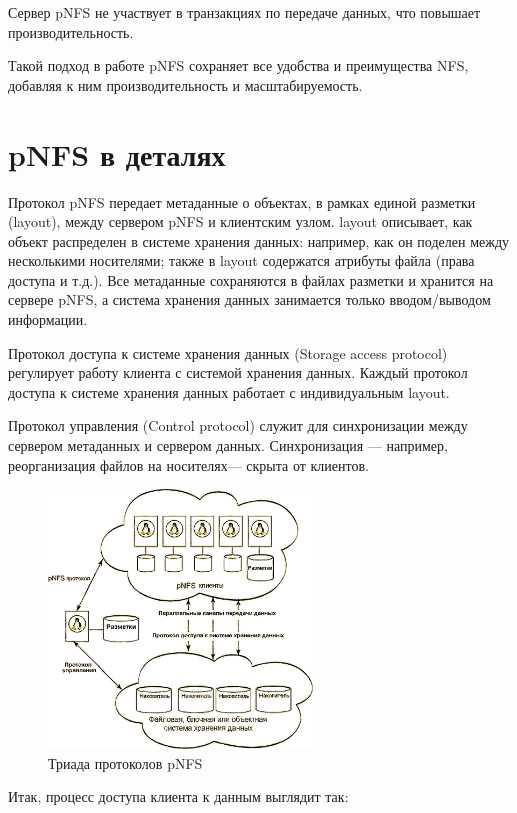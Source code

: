 \documentclass[10pt, a5paper]{article}
\begin{document}
Сервер pNFS не участвует в транзакциях по передаче данных, что повышает производительность.

Такой подход в работе pNFS сохраняет все удобства и преимущества NFS, добавляя к ним производительность и масштабируемость.

\section*{pNFS в деталях}

Протокол pNFS передает метаданные о объектах, в рамках единой разметки (layout), между сервером pNFS и клиентским узлом. layout описывает, как объект распределен в системе хранения данных: например, как он поделен между несколькими носителями; также в layout содержатся атрибуты файла (права доступа и т.д.). Все метаданные сохраняются в файлах разметки и хранится на сервере pNFS, а система хранения данных занимается только вводом/выводом информации.

Протокол доступа к системе хранения данных (Storage access protocol) регулирует работу клиента  с системой хранения данных. Каждый протокол доступа к системе хранения данных работает с индивидуальным layout.

Протокол управления (Control protocol) служит для синхронизации между сервером метаданных и сервером данных. Синхронизация — например, реорганизация файлов на носителях— скрыта от клиентов.

\begin{center}
\begin{figure}[h!]
  \centering
  \includegraphics[width=7cm]{16_2018_Sharpio3}
  \caption{Триада протоколов pNFS}
  \label{Sharpio3}
\end{figure}
\end{center} 

Итак, процесс доступа клиента к данным выглядит так:
\end{document}
